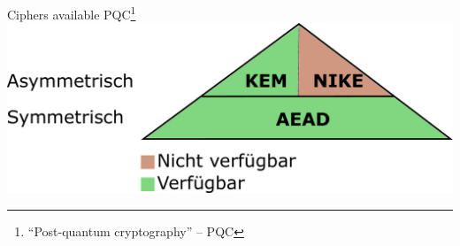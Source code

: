 \documentclass{rosenpass-beamer}
\let\say\enquote
\begin{document}
\begin{frame}{Ciphers available PQC\footnote{\say{Post-quantum cryptography} -- PQC}}
    \includegraphics[height=.6\textheight]{graphics/Primitivenpyramide.pdf}
\end{frame}

\end{document}
